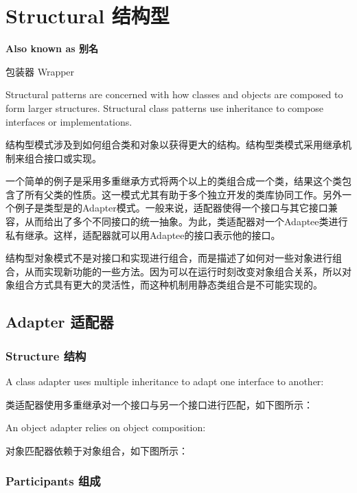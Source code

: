 \chapter{Structural 结构型}

\textbf{Also known as 别名}

包装器 Wrapper


Structural patterns are concerned with how classes and objects are composed to form larger structures. Structural class patterns use inheritance to compose interfaces or implementations.

结构型模式涉及到如何组合类和对象以获得更大的结构。结构型类模式采用继承机制来组合接口或实现。

一个简单的例子是采用多重继承方式将两个以上的类组合成一个类，结果这个类包含了所有父类的性质。这一模式尤其有助于多个独立开发的类库协同工作。另外一个例子是类型是的Adapter模式。一般来说，适配器使得一个接口与其它接口兼容，从而给出了多个不同接口的统一抽象。为此，类适配器对一个Adaptee类进行私有继承。这样，适配器就可以用Adaptee的接口表示他的接口。

结构型对象模式不是对接口和实现进行组合，而是描述了如何对一些对象进行组合，从而实现新功能的一些方法。因为可以在运行时刻改变对象组合关系，所以对象组合方式具有更大的灵活性，而这种机制用静态类组合是不可能实现的。


\section{Adapter 适配器}

\subsection{Structure 结构}

A class adapter uses multiple inheritance to adapt one interface to another:

类适配器使用多重继承对一个接口与另一个接口进行匹配，如下图所示：


An object adapter relies on object composition:

对象匹配器依赖于对象组合，如下图所示：


\subsection{Participants 组成}

